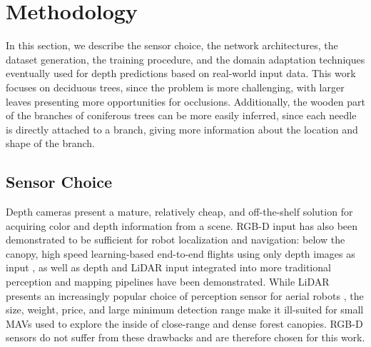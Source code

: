 \section{Methodology}
In this section, we describe the sensor choice, the network architectures, the dataset generation, the training procedure, and the domain adaptation techniques eventually used for depth predictions based on real-world input data. 
This work focuses on deciduous trees, since the problem is more challenging, with larger leaves presenting more opportunities for occlusions. Additionally, the wooden part of the branches of coniferous trees can be more easily inferred, since each needle is directly attached to a branch, giving more information about the location and shape of the branch.

\subsection{Sensor Choice}
Depth cameras present a mature, relatively cheap, and off-the-shelf solution for acquiring color and depth information from a scene.
\mbox{RGB-D} input has also been demonstrated to be sufficient for robot localization and navigation: below the canopy, high speed learning-based end-to-end flights using only depth images as input \cite{Loquercio2021}, as well as depth and LiDAR input integrated into more traditional perception and mapping pipelines \cite{Zhou2022, Liu2022} have been demonstrated. %
While LiDAR presents an increasingly popular choice of perception sensor for aerial robots \cite{DePetris2022, Liu2022}, the size, weight, price, and large minimum detection range make it ill-suited for small MAVs used to explore the inside of close-range and dense forest canopies. RGB-D sensors do not suffer from these drawbacks and are therefore chosen for this work.  

